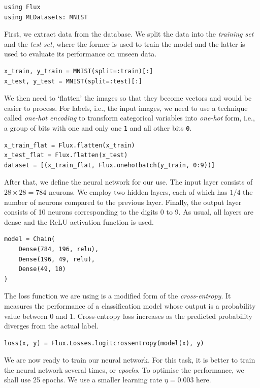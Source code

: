 \documentclass[a4paper,11pt,titlepage]{article}
\theoremstyle{definition}
\theoremstyle{plain}
\theoremstyle{remark}
\begin{document}
\begin{verbatim}
using Flux
using MLDatasets: MNIST
\end{verbatim}

First, we extract data from the database. We split the data into the \textit{training set} and the \textit{test set}, where the former is used to train the model and the latter is used to evaluate its performance on unseen data.

\begin{verbatim}
x_train, y_train = MNIST(split=:train)[:]
x_test, y_test = MNIST(split=:test)[:]
\end{verbatim}

We then need to ‘flatten’ the images so that they become vectors and would be easier to process. For labels, i.e., the input images, we need to use a technique called \textit{one-hot encoding} to transform categorical variables into \textit{one-hot} form, i.e., a group of bits with one and only one \verb|1| and all other bits \verb|0|.

\begin{verbatim}
x_train_flat = Flux.flatten(x_train)
x_test_flat = Flux.flatten(x_test)
dataset = [(x_train_flat, Flux.onehotbatch(y_train, 0:9))]
\end{verbatim}

After that, we define the neural network for our use. The input layer consists of $28\times 28 = 784$ neurons. We employ two hidden layers, each of which has $1/4$ the number of neurons compared to the previous layer. Finally, the output layer consists of 10 neurons corresponding to the digits 0 to 9. As usual, all layers are dense and the ReLU activation function is used.

\begin{verbatim}
model = Chain(
    Dense(784, 196, relu),
    Dense(196, 49, relu),
    Dense(49, 10)
)
\end{verbatim}

The loss function we are using is a modified form of the \textit{cross-entropy}. It measures the performance of a classification model whose output is a probability value between $0$ and $1$. Cross-entropy loss increases as the predicted probability diverges from the actual label.

\begin{verbatim}
loss(x, y) = Flux.Losses.logitcrossentropy(model(x), y)
\end{verbatim}

We are now ready to train our neural network. For this task, it is better to train the neural network several times, or \textit{epochs}. To optimise the performance, we shall use 25 epochs. We use a smaller learning rate $\eta = 0.003$ here.
\end{document}
